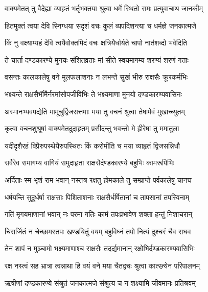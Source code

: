 
\twolineshloka
{वाक्यमेतत् तु वैदेह्या व्याहृतं भर्तृभक्तया}
{श्रुत्वा धर्मे स्थितो रामः प्रत्युवाचाथ जानकीम्} %

\twolineshloka
{हितमुक्तं त्वया देवि स्निग्धया सदृशं वचः}
{कुलं व्यपदिशन्त्या च धर्मज्ञे जनकात्मजे} %

\twolineshloka
{किं नु वक्ष्याम्यहं देवि त्वयैवोक्तमिदं वचः}
{क्षत्रियैर्धार्यते चापो नार्तशब्दो भवेदिति} %

\twolineshloka
{ते चार्ता दण्डकारण्ये मुनयः संशितव्रताः}
{मां सीते स्वयमागम्य शरण्यं शरणं गताः} %

\twolineshloka
{वसन्तः कालकालेषु वने मूलफलाशनाः}
{न लभन्ते सुखं भीरु राक्षसैः क्रूरकर्मभिः} %

\twolineshloka
{भक्ष्यन्ते राक्षसैर्भीमैर्नरमांसोपजीविभिः}
{ते भक्ष्यमाणा मुनयो दण्डकारण्यवासिनः} %

\twolineshloka
{अस्मानभ्यवपद्येति मामूचुर्द्विजसत्तमाः}
{मया तु वचनं श्रुत्वा तेषामेवं मुखाच्च्युतम्} %

\twolineshloka
{कृत्वा वचनशुश्रूषां वाक्यमेतदुदाहृतम्}
{प्रसीदन्तु भवन्तो मे ह्रीरेषा तु ममातुला} %

\twolineshloka
{यदीदृशैरहं विप्रैरुपस्थेयैरुपस्थितः}
{किं करोमीति च मया व्याहृतं द्विजसन्निधौ} %

\twolineshloka
{सर्वैरेव समागम्य वागियं समुदाहृता}
{राक्षसैर्दण्डकारण्ये बहुभिः कामरूपिभिः} %

\twolineshloka
{अर्दिताः स्म भृशं राम भवान् नस्तत्र रक्षतु}
{होमकाले तु सम्प्राप्ते पर्वकालेषु चानघ} %

\twolineshloka
{धर्षयन्ति सुदुर्धर्षा राक्षसाः पिशिताशनाः}
{राक्षसैर्धर्षितानां च तापसानां तपस्विनाम्} %

\twolineshloka
{गतिं मृगयमाणानां भवान् नः परमा गतिः}
{कामं तपःप्रभावेण शक्ता हन्तुं निशाचरान्} %

\twolineshloka
{चिरार्जितं न चेच्छामस्तपः खण्डयितुं वयम्}
{बहुविघ्नं तपो नित्यं दुश्चरं चैव राघव} %

\twolineshloka
{तेन शापं न मुञ्चामो भक्ष्यमाणाश्च राक्षसैः}
{तदर्द्यमानान् रक्षोभिर्दण्डकारण्यवासिभिः} %

\twolineshloka
{रक्ष नस्त्वं सह भ्रात्रा त्वन्नाथा हि वयं वने}
{मया चैतद्वचः श्रुत्वा कात्स्न्र्येन परिपालनम्} %

\twolineshloka
{ऋषीणां दण्डकारण्ये संश्रुतं जनकात्मजे}
{संश्रुत्य च न शक्ष्यामि जीवमानः प्रतिश्रवम्} %

